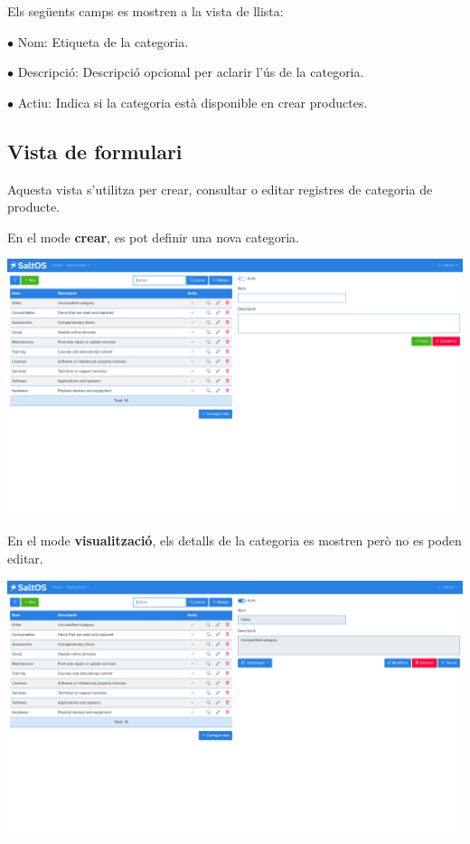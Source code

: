 \documentclass[a4paper]{article}
\begin{document}
Els següents camps es mostren a la vista de llista:

\begin{compactitem}
\item[\color{myblue}$\bullet$] Nom: Etiqueta de la categoria.
\item[\color{myblue}$\bullet$] Descripció: Descripció opcional per aclarir l’ús de la categoria.
\item[\color{myblue}$\bullet$] Actiu: Indica si la categoria està disponible en crear productes.
\end{compactitem}

\hypertarget{toc159}{}
\subsection{Vista de formulari}

Aquesta vista s'utilitza per crear, consultar o editar registres de categoria de producte.

En el mode \textbf{crear}, es pot definir una nova categoria.

\begin{center}\includegraphics[width=1\textwidth]{../ujest/snaps/test-screenshots-js-screenshots-sales-products-categories-create-ca-es-1-snap.png}\end{center}

En el mode \textbf{visualització}, els detalls de la categoria es mostren però no es poden editar.

\begin{center}\includegraphics[width=1\textwidth]{../ujest/snaps/test-screenshots-js-screenshots-sales-products-categories-view-10-ca-es-1-snap.png}\end{center}
\end{document}
